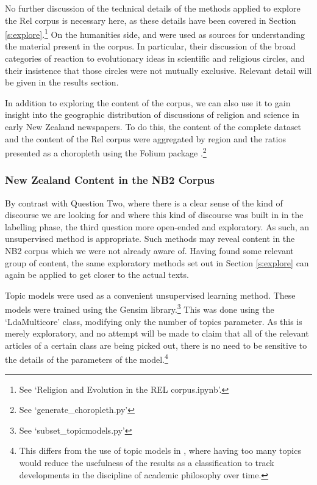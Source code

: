 \documentclass{article}
\begin{document}
No further discussion of the technical details of the methods applied to explore the Rel corpus is necessary here, as these details have been covered in Section \ref{s:explore}.\footnote{See `Religion and Evolution in the REL corpus.ipynb'.} On the humanities side, \cite{dupree} and \cite{gregory} were used as sources for understanding the material present in the corpus. In particular, their discussion of the broad categories of reaction to evolutionary ideas in scientific and religious circles, and their insistence that those circles were not mutually exclusive. Relevant detail will be given in the results section.

In addition to exploring the content of the corpus, we can also use it to gain insight into the geographic distribution of discussions of religion and science in early New Zealand newspapers. To do this, the content of the complete dataset and the content of the Rel corpus were aggregated by region and the ratios presented as a choropleth using the Folium package \cite{folium}.\footnote{See `generate\_\-choropleth.py'}

\subsubsection{New Zealand Content in the NB2 Corpus}

By contrast with Question Two, where there is a clear sense of the kind of discourse we are looking for and where this kind of discourse was built in in the labelling phase, the third question more open-ended and exploratory. As such, an unsupervised method is appropriate. Such methods may reveal content in the NB2 corpus which we were not already aware of. Having found some relevant group of content, the same exploratory methods set out in Section \ref{s:explore} can again be applied to get closer to the actual texts.

Topic models were used as a convenient unsupervised learning method. These  models were trained using the Gensim library.\footnote{See `subset\_\-topicmodels.py'} This was done using the `LdaMulticore' class, modifying only the number of topics parameter. As this is merely exploratory, and no attempt will be made to claim that all of the relevant articles of a certain class are being picked out, there is no need to be sensitive to the details of the parameters of the model.\footnote{This differs from the use of topic models in \cite{weatherson}, where having too many topics would reduce the usefulness of the results as a classification to track developments in the discipline of academic philosophy over time.}
\end{document}
